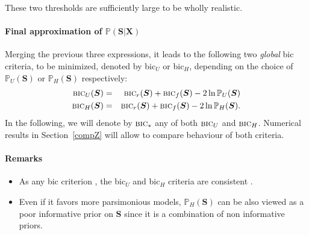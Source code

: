 \documentclass[12pt,a4paper]{report}
\begin{document}
These two thresholds are sufficiently large to be wholly realistic.

\paragraph{Final approximation of $\mathbb{P}(\boldsymbol{S}|\boldsymbol{X})$}
Merging the previous three expressions, it leads to the following two {\it global} {\sc bic} criteria, to be minimized, denoted by {\sc bic}$_U$ or {\sc bic}$_H$, depending on the choice of $\mathbb{P}_U(\boldsymbol{S})$ or $\mathbb{P}_H(\boldsymbol{S})$ respectively:
\begin{eqnarray}
\mbox{{\sc bic}}_U(\boldsymbol{S}) & = & \mbox{{\sc bic}}_r(\boldsymbol{S}) + \mbox{{\sc bic}}_f(\boldsymbol{S}) - 2\ln \mathbb{P}_U(\boldsymbol{S})  \nonumber \\
\mbox{{\sc bic}}_H(\boldsymbol{S}) & = & \mbox{{\sc bic}}_r(\boldsymbol{S}) + \mbox{{\sc bic}}_f(\boldsymbol{S}) - 2\ln \mathbb{P}_H(\boldsymbol{S}). \nonumber 
\end{eqnarray}
In the following, we will denote by $\mbox{{\sc bic}}_*$ any of both $\mbox{{\sc bic}}_U$ and $\mbox{{\sc bic}}_H$. Numerical results in Section~\ref{compZ} will allow to compare behaviour of both criteria.

\paragraph{Remarks}
\begin{itemize}
\item As any {\sc bic} criterion \cite{BIChuard}, the {\sc bic}$_U$ and {\sc bic}$_H$ criteria are consistent .
\item Even if it favors more parsimonious models, $\mathbb{P}_H(\boldsymbol{S})$ can be also viewed as a poor informative prior on $\boldsymbol{S}$ since it is a combination of non informative priors.
\end{itemize}



%	 
%	
\end{document}
